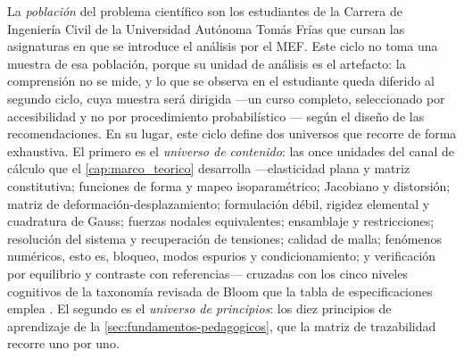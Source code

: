 La \emph{población} del problema científico son los estudiantes de la Carrera de Ingeniería Civil de la Universidad Autónoma Tomás Frías que cursan las asignaturas en que se introduce el análisis por el MEF. %
Este ciclo no toma una muestra de esa población, porque su unidad de análisis es el artefacto: la comprensión no se mide, y lo que se observa en el estudiante queda diferido al segundo ciclo, cuya muestra será dirigida —un curso completo, seleccionado por accesibilidad y no por procedimiento probabilístico \autocite[p.~215]{sampieri2018metodologia}— según el diseño de las recomendaciones. En su lugar, este ciclo define dos universos que recorre de forma exhaustiva. El primero es el \emph{universo de contenido}: las once unidades del canal de cálculo que el \autoref{cap:marco_teorico} desarrolla —elasticidad plana y matriz constitutiva; funciones de forma y mapeo isoparamétrico; Jacobiano y distorsión; matriz de deformación-desplazamiento; formulación débil, rigidez elemental y cuadratura de Gauss; fuerzas nodales equivalentes; ensamblaje y restricciones; resolución del sistema y recuperación de tensiones; calidad de malla; fenómenos numéricos, esto es, bloqueo, modos espurios y condicionamiento; y verificación por equilibrio y contraste con referencias— cruzadas con los cinco niveles cognitivos de la taxonomía revisada de Bloom que la tabla de especificaciones emplea \autocite{anderson2001taxonomy}. El segundo es el \emph{universo de principios}: los diez principios de aprendizaje de la \autoref{sec:fundamentos-pedagogicos}, que la matriz de trazabilidad recorre uno por uno.

